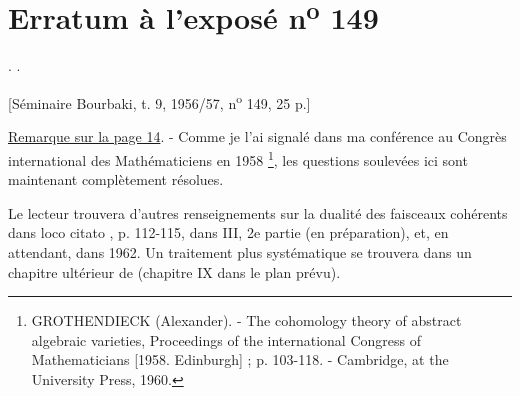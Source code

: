 \clearpage
\chapter*{Erratum à l'exposé n\textsuperscript{o} 149}
\setcounter{footnote}{0}
\begingroup
\makeatletter
\renewcommand\@makefnmark{\hbox{\normalfont(\textsuperscript{\@thefnmark})}}
\makeatother

. .

\begin{center}
[Séminaire Bourbaki, t. 9, 1956/57, n\textsuperscript{o} 149, 25 p.]
\end{center}

\noindent\uline{Remarque sur la page 14}. - Comme je l'ai signalé dans ma
conférence au Congrès international des Mathématiciens en 1958 \footnote{
GROTHENDIECK (Alexander). - The cohomology theory of abstract algebraic
varieties, Proceedings of the international Congress of Mathematicians
[1958. Edinburgh] ; p. 103-118. - Cambridge, at the University Press, 1960.},
les questions soulevées ici sont maintenant complètement résolues.

Le lecteur trouvera d'autres renseignements sur la dualité des faisceaux
cohérents dans loco citato \footnotemark[1], p. 112-115, dans  III,
2e partie (en préparation), et, en attendant, dans  1962.
Un traitement plus systématique se trouvera dans un chapitre ultérieur de 
(chapitre IX dans le plan prévu).
\endgroup
